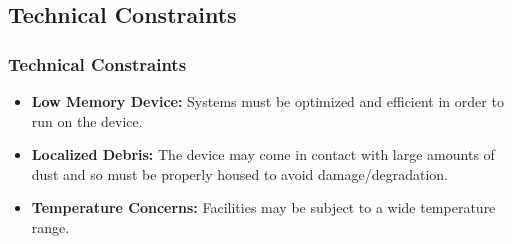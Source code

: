 \subsection{Technical Constraints}
\begin{frame}
\frametitle{Technical Constraints}

\begin{itemize}
\item \textbf{Low Memory Device: }Systems must be optimized and efficient in order to run on the device.
\item \textbf{Localized Debris: }The device may come in contact with large amounts of dust and so must be properly housed to avoid damage/degradation.
\item \textbf{Temperature Concerns: }Facilities may be subject to a wide temperature range. 
\end{itemize}

\end{frame}


